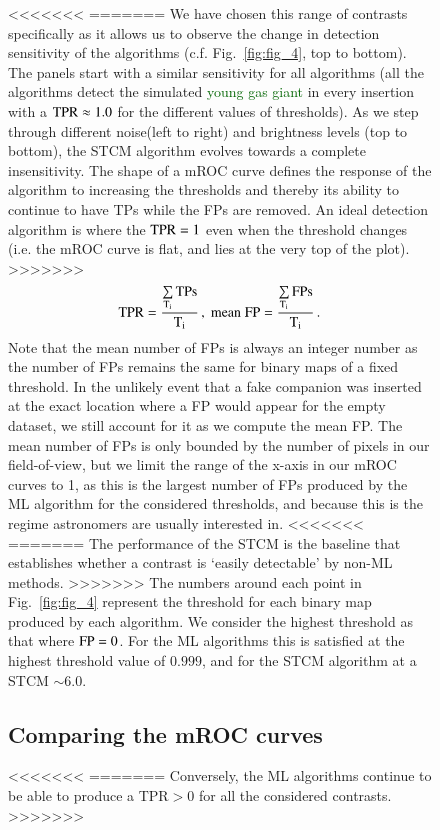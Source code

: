 \documentclass{aa}
\newcommand{\newchange}[1]{\textcolor{darkgreen}{#1}}
\begin{document}
{{{\begin{figure}[t]
{<<<<<<<
=======
We have chosen this range of contrasts specifically as it allows us to observe the change in detection sensitivity of the algorithms (c.f. Fig.~\ref{fig:fig_4}, top to bottom). The panels start with a similar sensitivity for all algorithms (all the algorithms detect the simulated \newchange{young gas giant} in every insertion with a ${\rm TPR}\approx 1.0$ for the different values of thresholds). 
As we step through different noise(left to right) and brightness levels (top to bottom), the STCM algorithm evolves towards a complete insensitivity.
The shape of a mROC curve defines the response of the algorithm to increasing the thresholds and thereby its ability to continue to have TPs while the FPs are removed.
An ideal detection algorithm is where the ${\rm TPR}=1$ even when the threshold changes (i.e. the mROC curve is flat, and lies at the very top of the plot).
>>>>>>>
\begin{equation}
\rm{TPR} =\dfrac{\sum\limits_{T_i}\rm{TPs}}{T_i} \, , \; 
\rm{mean\; FP} = \dfrac{\sum\limits_{T_i}FPs}{T_i} \, .
\label{eq:TPR}
\end{equation}
Note that the mean number of FPs is always an integer number as the number of FPs remains the same for binary maps of a fixed threshold.
In the unlikely event that a fake companion was inserted at the exact location where a FP would appear for the empty dataset, we still account for it as we compute the mean FP. The mean number of FPs is only bounded by the number of pixels in our field-of-view, but we limit the range of the x-axis in our mROC curves to 1, as this is the largest number of FPs produced by the ML algorithm for the considered thresholds, and because this is the regime astronomers are usually interested in.
<<<<<<<
=======
The performance of the STCM is the baseline that establishes whether a contrast is `easily detectable' by non-ML methods. 
>>>>>>>
The numbers around each point in Fig.~\ref{fig:fig_4} represent the threshold for each binary map produced by each algorithm.
We consider the highest threshold as that where ${\rm FP} = 0$.
For the ML algorithms this is satisfied at the highest threshold value of $0.999$, and for the STCM algorithm at a STCM $\sim 6.0$. 


\subsection{Comparing the mROC curves}
<<<<<<<
=======
Conversely, the ML algorithms continue to be able to produce a TPR$>0$ for all the considered contrasts.
>>>>>>>
\label{sec:roc}

}
\end{figure}}}}
\end{document}
